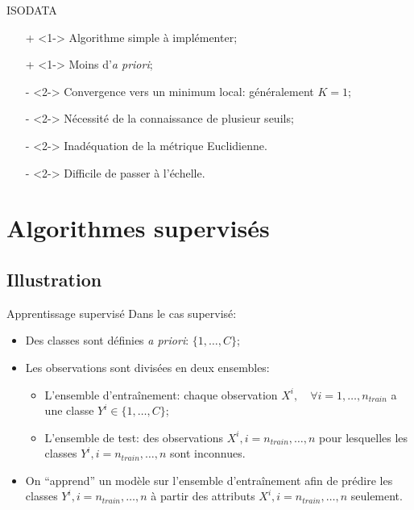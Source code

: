 \documentclass[8pt]{beamer}
\begin{document}
			\begin{frame}{ISODATA}
				\begin{itemize}
					\item[\color{green}+]<1-> Algorithme simple à implémenter;
					\item[\color{green}+]<1-> Moins d'\textit{a priori};
					\item[\color{red}-]<2-> Convergence vers un minimum local: généralement \(K = 1\);
					\item[\color{red}-]<2-> Nécessité de la connaissance de plusieur seuils;
					\item[\color{red}-]<2-> Inadéquation de la métrique Euclidienne.
					\item[\color{red}-]<2-> Difficile de passer à l'échelle.
				\end{itemize}
			\end{frame}

	\section{Algorithmes supervisés}
		\subsection{Illustration}
			\begin{frame}{Apprentissage supervisé}
				Dans le cas supervisé:
				\begin{itemize}
					\item<1-> Des classes sont définies \textit{a priori}: \(\{1,\dots, C\}\);
					\item<2-> Les observations sont divisées en deux ensembles:
						\begin{itemize}
							\item<3-> L'ensemble d'entraînement: chaque observation \(X^i, \quad \forall i=1,\dots,n_{train}\) a une classe \(Y^i \in \{1,\dots, C\}\);
							\item<4-> L'ensemble de test: des observations \(X^i, i=n_{train},\dots,n\) pour lesquelles les classes \(Y^i, i=n_{train},\dots,n\) sont inconnues.
						\end{itemize}
					\item<5-> On ``apprend'' un modèle sur l'ensemble d'entraînement afin de prédire les classes \(Y^i, i=n_{train},\dots,n\) à partir des attributs \(X^i, i=n_{train},\dots,n\) seulement.
				\end{itemize}
			\end{frame}
\end{document}
